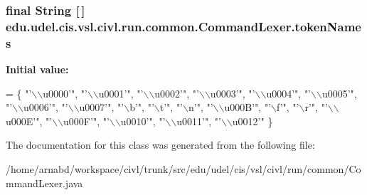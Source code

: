 \subsubsection[{token\+Names}]{\setlength{\rightskip}{0pt plus 5cm}final String \mbox{[}$\,$\mbox{]} edu.\+udel.\+cis.\+vsl.\+civl.\+run.\+common.\+Command\+Lexer.\+token\+Names\hspace{0.3cm}{\ttfamily [static]}}\label{classedu_1_1udel_1_1cis_1_1vsl_1_1civl_1_1run_1_1common_1_1CommandLexer_a04b2be53f8a734a8d5de7e5753eb1628}
{\bfseries Initial value\+:}
\begin{DoxyCode}
= \{
        \textcolor{stringliteral}{"'\(\backslash\)\(\backslash\)u0000'"}, \textcolor{stringliteral}{"'\(\backslash\)\(\backslash\)u0001'"}, \textcolor{stringliteral}{"'\(\backslash\)\(\backslash\)u0002'"}, \textcolor{stringliteral}{"'\(\backslash\)\(\backslash\)u0003'"}, \textcolor{stringliteral}{"'\(\backslash\)\(\backslash\)u0004'"}, \textcolor{stringliteral}{"'\(\backslash\)\(\backslash\)u0005'"}, 
        \textcolor{stringliteral}{"'\(\backslash\)\(\backslash\)u0006'"}, \textcolor{stringliteral}{"'\(\backslash\)\(\backslash\)u0007'"}, \textcolor{stringliteral}{"'\(\backslash\)b'"}, \textcolor{stringliteral}{"'\(\backslash\)t'"}, \textcolor{stringliteral}{"'\(\backslash\)n'"}, \textcolor{stringliteral}{"'\(\backslash\)\(\backslash\)u000B'"}, \textcolor{stringliteral}{"'\(\backslash\)f'"}, 
        \textcolor{stringliteral}{"'\(\backslash\)r'"}, \textcolor{stringliteral}{"'\(\backslash\)\(\backslash\)u000E'"}, \textcolor{stringliteral}{"'\(\backslash\)\(\backslash\)u000F'"}, \textcolor{stringliteral}{"'\(\backslash\)\(\backslash\)u0010'"}, \textcolor{stringliteral}{"'\(\backslash\)\(\backslash\)u0011'"}, \textcolor{stringliteral}{"'\(\backslash\)\(\backslash\)u0012'"}
    \}
\end{DoxyCode}


The documentation for this class was generated from the following file\+:\begin{DoxyCompactItemize}
\item 
/home/arnabd/workspace/civl/trunk/src/edu/udel/cis/vsl/civl/run/common/Command\+Lexer.\+java\end{DoxyCompactItemize}

